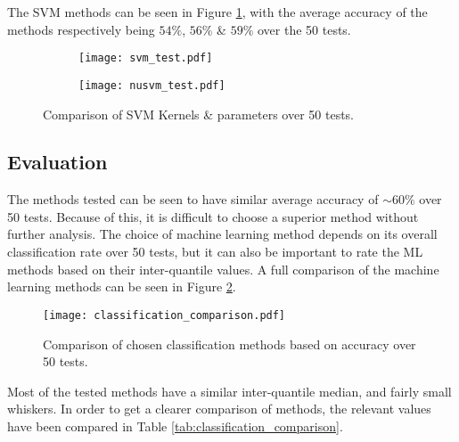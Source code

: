 \documentclass[../main.tex]{subfiles}
\begin{document}
The \gls{SVM} methods can be seen in Figure \ref{fig:svm_test}, with the average accuracy of the methods respectively being $54\%$, $56\%$ \& $59\%$ over the 50 tests.

\begin{figure}[H]
    \centering
    \begin{subfigure}[b]{1\textwidth}
        \centering
\texttt{[image: svm\_test.pdf]}
    \end{subfigure}
    \centering
    \begin{subfigure}[b]{1\textwidth}
        \centering
\texttt{[image: nusvm\_test.pdf]}
    \end{subfigure}
    \caption{Comparison of \gls{SVM} Kernels \& parameters over 50 tests.}
\label{fig:svm_test}
\end{figure}

\subsection{Evaluation}

The methods tested can be seen to have similar average accuracy of $\sim 60\%$ over 50 tests.
Because of this, it is difficult to choose a superior method without further analysis.
The choice of machine learning method depends on its overall classification rate over 50 tests, but it can also be important to rate the ML methods based on their inter-quantile values.
A full comparison of the machine learning methods can be seen in Figure \ref{fig:classification_comparison}.

\begin{figure}[H]
\begin{center}
\texttt{[image: classification\_comparison.pdf]}
\caption{Comparison of chosen classification methods based on accuracy over 50 tests.}
\label{fig:classification_comparison}
\end{center}
\end{figure}

Most of the tested methods have a similar inter-quantile median, and fairly small whiskers.
In order to get a clearer comparison of methods, the relevant values have been compared in Table \ref{tab:classification_comparison}.  
\end{document}
